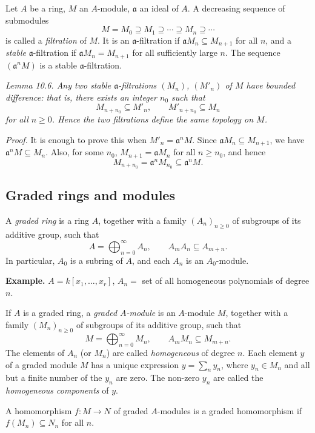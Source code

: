 Let $A$ be a ring, $M$ an $A$-module, $\mathfrak a$ an ideal of $A$. A decreasing sequence of submodules
\[
M=M_0\supseteq M_1\supseteq\cdots\supseteq M_n\supseteq\cdots
\]
is called a \textit{filtration} of $M$. It is an $\mathfrak a$-filtration if $\mathfrak aM_n\subseteq M_{n+1}$ for all $n$, and a \textit{stable} $\mathfrak a$-filtration if $\mathfrak aM_n=M_{n+1}$ for all sufficiently large $n$. The sequence $(\mathfrak a^nM)$ is a stable $\mathfrak a$-filtration.

\noindent\textit{Lemma 10.6. Any two stable $\mathfrak a$-filtrations $(M_n)$, $(M'_n)$ of $M$ have bounded difference: that is, there exists an integer $n_0$ such that}
\[
M_{n+n_0}\subseteq M'_n,\qquad M'_{n+n_0}\subseteq M_n
\]
\textit{for all $n\geq0$. Hence the two filtrations define the same topology on $M$.}

\noindent\textit{Proof.} It is enough to prove this when $M'_n=\mathfrak a^nM$. Since $\mathfrak aM_n\subseteq M_{n+1}$, we have $\mathfrak a^nM\subseteq M_n$. Also, for some $n_0$, $M_{n+1}=\mathfrak aM_n$ for all $n\geq n_0$, and hence
\[
M_{n+n_0}=\mathfrak a^nM_{n_0}\subseteq\mathfrak a^nM.
\]
\proofbox

\subsection{Graded rings and modules}

A \textit{graded ring} is a ring $A$, together with a family $(A_n)_{n\geq0}$ of subgroups of its additive group, such that
\[
A=\bigoplus_{n=0}^{\infty}A_n,\qquad A_mA_n\subseteq A_{m+n}.
\]
In particular, $A_0$ is a subring of $A$, and each $A_n$ is an $A_0$-module.

\noindent\textbf{Example.} $A=k[x_1,\ldots,x_r]$, $A_n=$ set of all homogeneous polynomials of degree $n$.

If $A$ is a graded ring, a \textit{graded $A$-module} is an $A$-module $M$, together with a family $(M_n)_{n\geq0}$ of subgroups of its additive group, such that
\[
M=\bigoplus_{n=0}^{\infty}M_n,\qquad A_mM_n\subseteq M_{m+n}.
\]
The elements of $A_n$ (or $M_n$) are called \textit{homogeneous} of degree $n$. Each element $y$ of a graded module $M$ has a unique expression $y=\sum_ny_n$, where $y_n\in M_n$ and all but a finite number of the $y_n$ are zero. The non-zero $y_n$ are called the \textit{homogeneous components} of $y$.

A homomorphism $f:M\longrightarrow N$ of graded $A$-modules is a graded homomorphism if $f(M_n)\subseteq N_n$ for all $n$.

